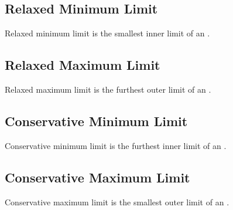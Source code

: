 \documentclass[letterpaper,10pt,english]{sphinxmanual}
\begin{document}
\subsection{Relaxed Minimum Limit}
\label{\detokenize{quantities/insolation_models/relaxed_minimum_limit:relaxed-minimum-limit}}\label{\detokenize{quantities/insolation_models/relaxed_minimum_limit::doc}}\label{\detokenize{quantities/insolation_models/relaxed_minimum_limit:id1}}
\sphinxAtStartPar
Relaxed minimum limit is the smallest inner limit of an {\hyperref[\detokenize{quantities/insolation_models/insolation_models:id1}]{}}.


\subsection{Relaxed Maximum Limit}
\label{\detokenize{quantities/insolation_models/relaxed_maximum_limit:relaxed-maximum-limit}}\label{\detokenize{quantities/insolation_models/relaxed_maximum_limit::doc}}\label{\detokenize{quantities/insolation_models/relaxed_maximum_limit:id1}}
\sphinxAtStartPar
Relaxed maximum limit is the furthest outer limit of an {\hyperref[\detokenize{quantities/insolation_models/insolation_models:id1}]{}}.


\subsection{Conservative Minimum Limit}
\label{\detokenize{quantities/insolation_models/conservative_minimum_limit:conservative-minimum-limit}}\label{\detokenize{quantities/insolation_models/conservative_minimum_limit::doc}}\label{\detokenize{quantities/insolation_models/conservative_minimum_limit:id1}}
\sphinxAtStartPar
Conservative minimum limit is the furthest inner limit of an {\hyperref[\detokenize{quantities/insolation_models/insolation_models:id1}]{}}.


\subsection{Conservative Maximum Limit}
\label{\detokenize{quantities/insolation_models/conservative_maximum_limit:conservative-maximum-limit}}\label{\detokenize{quantities/insolation_models/conservative_maximum_limit::doc}}\label{\detokenize{quantities/insolation_models/conservative_maximum_limit:id1}}
\sphinxAtStartPar
Conservative maximum limit is the smallest outer limit of an {\hyperref[\detokenize{quantities/insolation_models/insolation_models:id1}]{}}.
\end{document}

